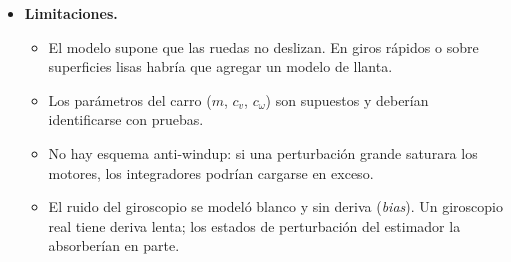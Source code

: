 \documentclass[11pt,letterpaper]{article}
\begin{document}
\begin{itemize}
  \item \textbf{Limitaciones.}
  \begin{itemize}
    \item El modelo supone que las ruedas no deslizan. En giros rápidos o sobre superficies lisas habría que agregar un modelo de llanta.
    \item Los parámetros del carro ($m$, $c_v$, $c_\omega$) son supuestos y deberían identificarse con pruebas.
    \item No hay esquema anti-windup: si una perturbación grande saturara los motores, los integradores podrían cargarse en exceso.
    \item El ruido del giroscopio se modeló blanco y sin deriva (\emph{bias}). Un giroscopio real tiene deriva lenta; los estados de perturbación del estimador la absorberían en parte.
  \end{itemize}
\end{itemize}

\end{document}
